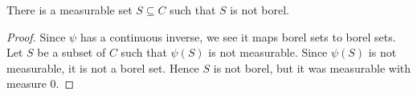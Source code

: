 \begin{corollary}
	There is a measurable set \(S \subseteq C\) such that \(S\) is not borel.
\end{corollary}
\begin{proof}
	Since \(\psi\) has a continuous inverse, we see it maps borel sets to borel sets. Let \(S\) be a subset of \(C\) such that \(\psi\left( S \right) \) is not measurable. Since \(\psi\left( S \right) \) is not measurable, it is not a borel set. Hence \(S\) is not borel, but it was measurable with measure \(0\).
\end{proof}
